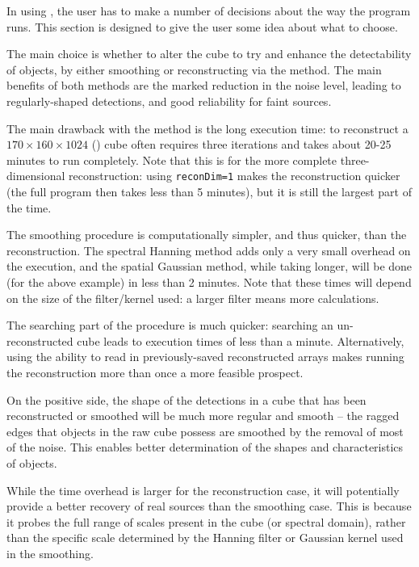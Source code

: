 \label{sec-notes}

In using \duchamp, the user has to make a number of decisions about
the way the program runs. This section is designed to give the user
some idea about what to choose.

The main choice is whether to alter the cube to try and enhance the
detectability of objects, by either smoothing or reconstructing via
the \atrous method. The main benefits of both methods are the marked
reduction in the noise level, leading to regularly-shaped detections,
and good reliability for faint sources.

The main drawback with the \atrous method is the long execution time:
to reconstruct a $170\times160\times1024$ (\hipass) cube often
requires three iterations and takes about 20-25 minutes to run
completely. Note that this is for the more complete three-dimensional
reconstruction: using \texttt{reconDim=1} makes the reconstruction
quicker (the full program then takes less than 5 minutes), but it is
still the largest part of the time.

The smoothing procedure is computationally simpler, and thus quicker,
than the reconstruction. The spectral Hanning method adds only a very
small overhead on the execution, and the spatial Gaussian method,
while taking longer, will be done (for the above example) in less than
2 minutes. Note that these times will depend on the size of the
filter/kernel used: a larger filter means more calculations.

The searching part of the procedure is much quicker: searching an
un-reconstructed cube leads to execution times of less than a
minute. Alternatively, using the ability to read in previously-saved
reconstructed arrays makes running the reconstruction more than once a
more feasible prospect.

On the positive side, the shape of the detections in a cube that has
been reconstructed or smoothed will be much more regular and smooth --
the ragged edges that objects in the raw cube possess are smoothed by
the removal of most of the noise. This enables better determination of
the shapes and characteristics of objects.

While the time overhead is larger for the reconstruction case, it will
potentially provide a better recovery of real sources than the
smoothing case. This is because it probes the full range of scales
present in the cube (or spectral domain), rather than the specific
scale determined by the Hanning filter or Gaussian kernel used in the
smoothing. 

